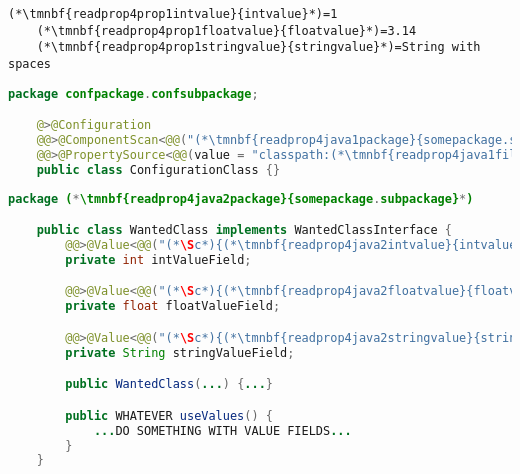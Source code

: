 \emtwen
{}%
\begin{lstlisting}[title={A \textit{properties} file called \tmnbf{readprop4prop1filename}{\textit{annotations.properties}}}]
    (*\tmnbf{readprop4prop1intvalue}{intvalue}*)=1
    (*\tmnbf{readprop4prop1floatvalue}{floatvalue}*)=3.14
    (*\tmnbf{readprop4prop1stringvalue}{stringvalue}*)=String with spaces
\end{lstlisting}
\begin{lstlisting}[language=Java, title={Configuration class}]
    package confpackage.confsubpackage;

    @>@Configuration
    @@>@ComponentScan<@@("(*\tmnbf{readprop4java1package}{somepackage.subpackage}[ForestGreen]*)")
    @@>@PropertySource<@@(value = "classpath:(*\tmnbf{readprop4java1filename}{annotations.properties}[ForestGreen]*)", encoding = "utf-8")
    public class ConfigurationClass {}
\end{lstlisting}
\begin{lstlisting}[language=Java, title={Wanted class with any constructor}]
    package (*\tmnbf{readprop4java2package}{somepackage.subpackage}*)

    public class WantedClass implements WantedClassInterface {
        @@>@Value<@@("(*\Sc*){(*\tmnbf{readprop4java2intvalue}{intvalue}[ForestGreen]*)}")
        private int intValueField;

        @@>@Value<@@("(*\Sc*){(*\tmnbf{readprop4java2floatvalue}{floatvalue}[ForestGreen]*)}")
        private float floatValueField;

        @@>@Value<@@("(*\Sc*){(*\tmnbf{readprop4java2stringvalue}{stringvalue}[ForestGreen]*)}")
        private String stringValueField;

        public WantedClass(...) {...}

        public WHATEVER useValues() {
            ...DO SOMETHING WITH VALUE FIELDS...
        }
    }
\end{lstlisting}
\newpage

